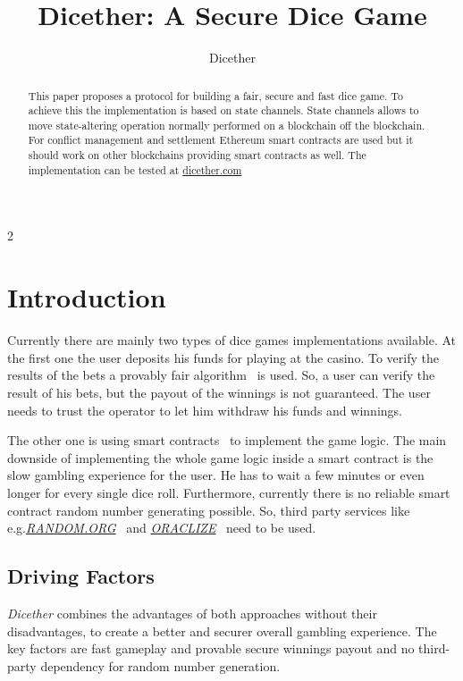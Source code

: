 \documentclass[oneside]{amsart}
\title{Dicether: A Secure Dice Game \DicetherPaperVersionNumber}
\author{Dicether}
\makeatletter
\newcommand*\eg{e.g.\@\xspace}
\makeatother
\begin{document}
\begin{abstract}
This paper proposes a protocol for building a fair, secure and fast dice game.
To achieve this the implementation is based on state channels.
State channels allows to move state-altering operation normally performed on a blockchain off the blockchain.
For conflict management and settlement Ethereum smart contracts are used but it should work on other blockchains providing
smart contracts as well.
The implementation can be tested at \url{dicether.com}
\end{abstract}

\maketitle

\setlength{\columnsep}{20pt}
\begin{multicols}{2}

\section{Introduction}\label{sec:introduction}
Currently there are mainly two types of dice games implementations available.
At the first one the user deposits his funds for playing at the casino.
To verify the results of the bets a provably fair algorithm~\cite{provableFair} is used.
So, a user can verify the result of his bets, but the payout of the winnings is not guaranteed.
The user needs to trust the operator to let him withdraw his funds and winnings.

The other one is using  smart contracts~\cite{ethereum} to implement the game logic.
The main downside of implementing the whole game logic inside a smart contract is the slow gambling experience for the user.
He has to wait a few minutes or even longer for every single dice roll.
Furthermore, currently there is no reliable smart contract random number generating possible.
So, third party services like \eg \href{https://random.org}{\emph{RANDOM.ORG}}~\cite{randomOrg}
and \href{https://oraclize.it}{\emph{ORACLIZE}}~\cite{oraclize} need to be used.

\subsection{Driving Factors}\label{subsec:driving_factors}
\emph{Dicether} combines the advantages of both approaches without
their disadvantages, to create a better and securer overall gambling experience.
The key factors are fast gameplay and provable secure winnings payout and no third-party dependency for
random number generation.


\end{multicols}
\end{document}
